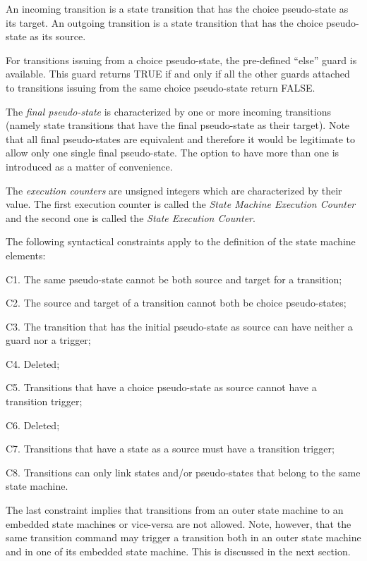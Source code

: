 \documentclass[definition]{../fwprofile}
\begin{document}
An incoming transition is a state transition that has the choice pseudo-state as its target. An
outgoing transition is a state transition that has the choice pseudo-state as its source.

For transitions issuing from a choice pseudo-state, the pre-defined “else” guard is available.
This guard returns TRUE if and only if all the other guards attached to transitions issuing from
the same choice pseudo-state return FALSE.

The \emph{final pseudo-state} is characterized by one or more incoming transitions (namely state
transitions that have the final pseudo-state as their target). Note that all final pseudo-states are
equivalent and therefore it would be legitimate to allow only one single final pseudo-state. The
option to have more than one is introduced as a matter of convenience.

The \emph{execution counters} are unsigned integers which are characterized by their value.
The first execution counter is called the \emph{State Machine Execution Counter} and the second one
is called the \emph{State Execution Counter}.

The following syntactical constraints apply to the definition of the state machine elements:

\begin{fw_itemize} 
\item C1. The same pseudo-state cannot be both source and target for a transition;
\item C2. The source and target of a transition cannot both be choice pseudo-states;
\item C3. The transition that has the initial pseudo-state as source can have neither a guard nor a trigger;
\item C4. Deleted;
\item C5. Transitions that have a choice pseudo-state as source cannot have a transition trigger;
\item C6. Deleted;
\item C7. Transitions that have a state as a source must have a transition trigger;
\item C8. Transitions can only link states and/or pseudo-states that belong to the same state machine.
\end{fw_itemize}

The last constraint implies that transitions from an outer state machine to an embedded state
machines or vice-versa are not allowed. Note, however, that the same transition command may
trigger a transition both in an outer state machine and in one of its embedded state machine.
This is discussed in the next section.
\end{document}
